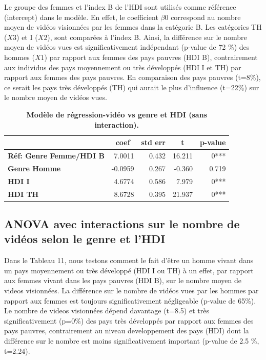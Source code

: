 \documentclass[12pt, a4paper, titlepage, table]{article}
\begin{document}
	Le groupe des femmes et l'index B de l'HDI sont utilisés comme référence (intercept) dans le modèle.
	En effet, le coefficient $\beta0$ correspond au nombre moyen de vidéos visionnées par les femmes dans la catégorie B. 
	Les catégories TH ($X3$) et I ($X2$), sont comparées à l'index B.
	Ainsi, la différence sur le nombre moyen de vidéos vues est significativement indépendant (p-value de 72 \%) des hommes ($X1$) par rapport aux femmes 
	des pays pauvres (HDI B), contrairement aux individus des pays moyennement ou très développés (HDI I et TH) par rapport aux femmes des pays pauvres.
	En comparaison des pays pauvres (t=8\%), ce serait les pays très développés (TH) qui aurait le plus d'influence (t=22\%) sur le nombre moyen de vidéos vues. 
	\begin{table}[H]
		\centering
		\fontsize{12}{20}\selectfont
		\begin{tabular}{|l|r|r|r|r|}
			\hline
			\multicolumn{1}{|c|}{\textbf{}}&
			\multicolumn{1}{c|}{\textbf{coef}}&
			\multicolumn{1}{c|}{\textbf{std err}}&
			\multicolumn{1}{c|}{\textbf{t}}&
			\multicolumn{1}{c|}{\textbf{p-value}}\\	
			\hline
			\textbf{Réf: Genre Femme/HDI B}&			7.0011&		0.432&	16.211&	0***\\	
			\textbf{Genre Homme}&	-0.0959&	0.267&	-0.360&	0.719\\
			\textbf{HDI I}&	4.6774&		0.586&	7.979&	0***\\
			\textbf{HDI TH}&	8.6728&		0.395&	21.937&	0***\\
			\hline
		\end{tabular}
		\caption{\textbf{Modèle de régression-vidéo vs genre et HDI (sans interaction).}}
	\end{table}	

	\subsection{ANOVA avec interactions sur le nombre de vidéos selon le genre et l'HDI}	
	Dans le Tableau 11, nous testons comment le fait d'être un homme vivant dans un pays moyennement ou très développé (HDI I ou TH) à un effet, par rapport 
	aux femmes vivant dans les pays pauvres (HDI B), sur le nombre moyen de videos visionnées. 
	La différence sur le nombre de vidéos vues par les hommes par rapport aux femmes est toujours significativement négligeable (p-value de 65\%). 
	Le nombre de videos visionnées dépend davantage (t=8.5) et très significativement (p=0\%) des pays très développés par rapport aux femmes des pays pauvres, 
	contrairement au niveau developpement des pays (HDI) dont la différence sur le nombre est moins significativement important (p-value de 2.5 \%, t=2.24).
	
\end{document}
